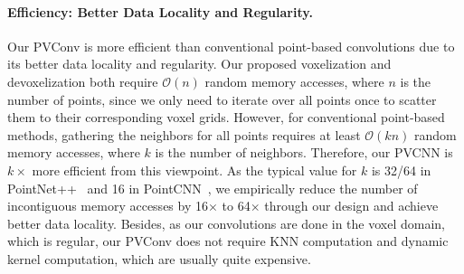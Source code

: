 \documentclass{article}
\def\modelshort{PVCNN\xspace}
\def\convshort{PVConv\xspace}
\begin{document}
\paragraph{Efficiency: Better Data Locality and Regularity.}

Our \convshort is more efficient than conventional point-based convolutions due to its better data locality and regularity. Our proposed voxelization and devoxelization both require $\mathcal{O}(n)$ random memory accesses, where $n$ is the number of points, since we only need to iterate over all points once to scatter them to their corresponding voxel grids. However, for conventional point-based methods, gathering the neighbors for all points requires at least $\mathcal{O}(kn)$ random memory accesses, where $k$ is the number of neighbors. Therefore, our \modelshort is $k\times$ more efficient from this viewpoint. As the typical value for $k$ is 32/64 in PointNet++~\cite{Qi:2017tf} and 16 in PointCNN~\cite{Li:2018tp}, we empirically reduce the number of incontiguous memory accesses by 16$\times$ to 64$\times$ through our design and achieve better data locality. Besides, as our convolutions are done in the voxel domain, which is regular, our \convshort does not require KNN computation and dynamic kernel computation, which are usually quite expensive.
\end{document}
